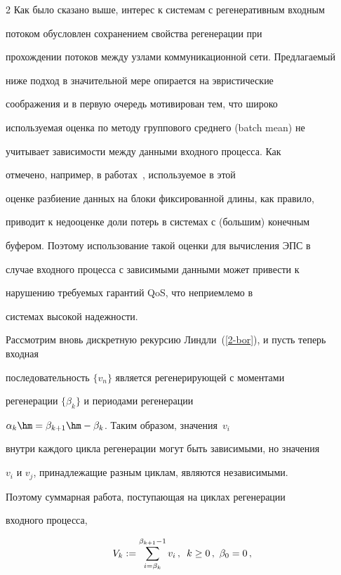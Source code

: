 \begin{multicols}{2}
Как было сказано выше,  интерес к  системам с регенеративным входным

потоком обусловлен сохранением свойства регенерации   при

прохождении потоков между узлами коммуникационной сети. Предлагаемый

ниже подход в значительной мере опирается на эвристические

соображения и в первую очередь мотивирован тем, что широко

используемая  оценка по методу группового среднего (batch mean) не

учитывает  зависимости между данными входного процесса. Как

отмечено, например, в работах~\cite{KRC, PPM09}, используемое в этой

оценке разбиение данных на блоки фиксированной длины, как правило,

приводит к недооценке доли потерь в системах  с (большим) конечным

буфером.  Поэтому использование такой оценки для вычисления ЭПС в

случае входного процесса с зависимыми данными может привести к

нарушению требуемых гарантий QoS, что неприемлемо в

системах высокой надежности.



 Рассмотрим вновь дискретную рекурсию Линдли~(\ref{2-bor}), и пусть теперь входная

 последовательность $\{v_n\}$ является регенерирующей с моментами

регенерации $\{\beta_k\}$ и периодами регенерации

$\alpha_k\hm=\beta_{k+1}\hm-\beta_k$. Таким образом,  значения~$v_i$

внутри каждого цикла регенерации могут быть зависимыми, но значения

$v_i$ и $v_j$, принадлежащие разным циклам, являются независимыми.

Поэтому  суммарная работа, поступающая на циклах регенерации

входного процесса,

\begin{equation}

   V_k:=\sum\limits_{i=\beta_k}^{\beta_{k+1}-1}v_i\,,\enskip k\ge

  0\,,\ \beta_0=0\,,

  \label{vor-eq9}


\end{equation}
\end{multicols}
